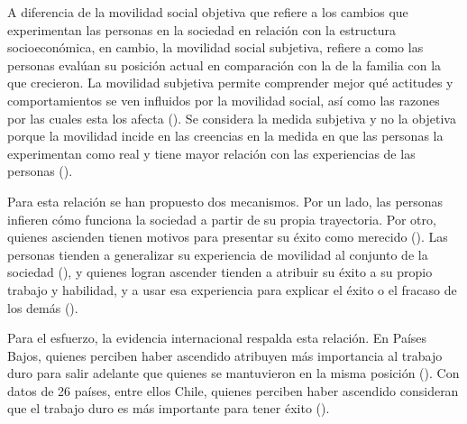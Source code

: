 \documentclass[
  spanish,
  a4paper,
  oneside]{scrbook}
\begin{document}
A diferencia de la movilidad social objetiva que refiere a los cambios
que experimentan las personas en la sociedad en relación con la
estructura socioeconómica, en cambio, la movilidad social subjetiva,
refiere a como las personas evalúan su posición actual en comparación
con la de la familia con la que crecieron. La movilidad subjetiva
permite comprender mejor qué actitudes y comportamientos se ven
influidos por la movilidad social, así como las razones por las cuales
esta los afecta (). Se considera la medida subjetiva y no la objetiva porque la
movilidad incide en las creencias en la medida en que las personas la
experimentan como real y tiene mayor relación con las experiencias de
las personas ().

Para esta relación se han propuesto dos mecanismos. Por un lado, las
personas infieren cómo funciona la sociedad a partir de su propia
trayectoria. Por otro, quienes ascienden tienen motivos para presentar
su éxito como merecido (). Las personas tienden a generalizar su experiencia de
movilidad al conjunto de la sociedad
(), y quienes logran ascender tienden a atribuir su
éxito a su propio trabajo y habilidad, y a usar esa experiencia para
explicar el éxito o el fracaso de los demás
().

Para el esfuerzo, la evidencia internacional respalda esta relación. En
Países Bajos, quienes perciben haber ascendido atribuyen más importancia
al trabajo duro para salir adelante que quienes se mantuvieron en la
misma posición (). Con datos de 26 países, entre ellos Chile, quienes perciben haber
ascendido consideran que el trabajo duro es más importante para tener
éxito
().
\end{document}
